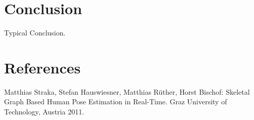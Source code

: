 \documentclass{acmtog} %
\begin{document}
\section{Conclusion}
\label{sec:conclusion}

Typical Conclusion.

\section{References}
\renewcommand{\section}[2]{}
\begin{raggedright}%
\begin{thebibliography}{X}
     Matthias Straka, Stefan Hauswiesner, Matthias Rüther, Horst Bischof: Skeletal Graph Based Human Pose Estimation in Real-Time. Graz University of Technology, Austria 2011.
\end{thebibliography}
\end{raggedright}
\end{document}
